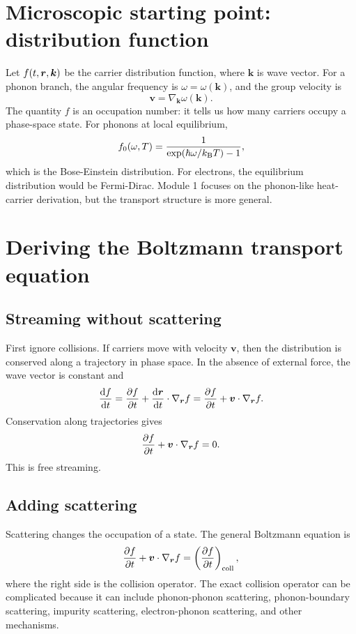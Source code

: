 \documentclass[11pt]{article}
\begin{document}
\section{Microscopic starting point: distribution function}
Let \(f(t,\bm{r},\bm{k})\) be the carrier distribution function, where \(\bm{k}\) is wave vector. For a phonon branch, the angular frequency is \(\omega=\omega(\bm{k})\), and the group velocity is
\begin{equation}
    \bm{v}=\nabla_{\bm{k}}\omega(\bm{k}).
\end{equation}
The quantity \(f\) is an occupation number: it tells us how many carriers occupy a phase-space state. For phonons at local equilibrium,
\begin{equation}
    f_0(\omega,T)=\frac{1}{\exp(\hbar\omega/k_{\mathrm{B}} T)-1},
\end{equation}
which is the Bose-Einstein distribution. For electrons, the equilibrium distribution would be Fermi-Dirac. Module 1 focuses on the phonon-like heat-carrier derivation, but the transport structure is more general.

\section{Deriving the Boltzmann transport equation}
\subsection{Streaming without scattering}
First ignore collisions. If carriers move with velocity \(\bm{v}\), then the distribution is conserved along a trajectory in phase space. In the absence of external force, the wave vector is constant and
\begin{equation}
    \frac{\dd f}{\dd t}
    =\frac{\partial f}{\partial t}
    +\frac{\dd \bm{r}}{\dd t}\cdot\nabla_{\bm{r}}f
    =\frac{\partial f}{\partial t}+\bm{v}\cdot\nabla_{\bm{r}}f.
\end{equation}
Conservation along trajectories gives
\begin{equation}
    \frac{\partial f}{\partial t}+\bm{v}\cdot\nabla_{\bm{r}}f=0.
\end{equation}
This is free streaming.

\subsection{Adding scattering}
Scattering changes the occupation of a state. The general Boltzmann equation is
\begin{equation}
    \frac{\partial f}{\partial t}+\bm{v}\cdot\nabla_{\bm{r}}f
    =\left(\frac{\partial f}{\partial t}\right)_{\mathrm{coll}},
\end{equation}
where the right side is the collision operator. The exact collision operator can be complicated because it can include phonon-phonon scattering, phonon-boundary scattering, impurity scattering, electron-phonon scattering, and other mechanisms.
\end{document}
